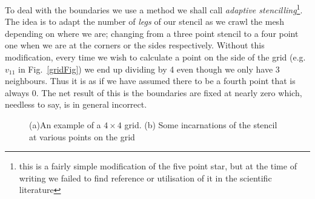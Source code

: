 \documentclass[a4paper]{article}
\begin{document}
To deal with the boundaries we use a method we shall call \emph{adaptive
stencilling}\footnote{this is a fairly simple modification of the five point
star, but at the time of writing we failed to find reference or utilisation of
it in the scientific literature}. The idea is to adapt the number of
\emph{legs} of our stencil as we crawl the mesh depending on where we are;
changing from a three point stencil to a four point one when we are at the
corners or the sides respectively. Without this modification, every time we
wish to calculate a point on the side of the grid (e.g. $v_{11}$ in
Fig.~\ref{gridFig}) we end up dividing by 4 even though we only have 3
neighbours. Thus it is as if we have assumed there to be a fourth point that is
always 0. The net result of this is the boundaries are fixed at nearly zero
which, needless to say, is in general incorrect.
\begin{figure}[!h]
  \centering
{}
  \hfill
  \caption{(a)An example of a $4 \times 4$ grid. (b) Some incarnations of the 
stencil at various points on the grid}
\end{figure}
\end{document}
